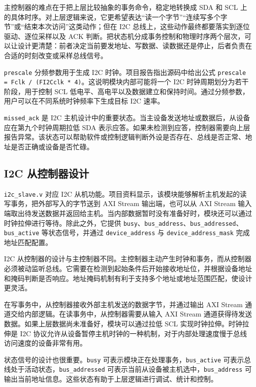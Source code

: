 \documentclass[12pt,a4paper]{article}
\numberwithin{equation}{section}
\begin{document}
主控制器的难点在于把上层比较抽象的事务命令，稳定地转换成 SDA 和 SCL 上的具体时序。对上层逻辑来说，它更希望表达“读一个字节”“连续写多个字节”或“结束本次访问”这类动作；但在 I2C 总线上，这些动作最终都要落实到逐位驱动、逐位采样以及 ACK 判断。把状态机分成事务控制和物理时序两个层次，可以让设计更清楚：前者决定当前要发地址、写数据、读数据还是停止，后者负责在合适的时刻改变或采样总线信号。

\texttt{prescale} 分频参数用于生成 I2C 时钟。项目报告指出源码中给出公式 \texttt{prescale = Fclk / (FI2Cclk * 4)}。这说明模块内部可能将一个 I2C 时钟周期划分为若干阶段，用于控制 SCL 低电平、高电平以及数据建立和保持时间。通过分频参数，用户可以在不同系统时钟频率下生成目标 I2C 速率。

\texttt{missed\_ack} 是 I2C 主机设计中的重要状态。当主设备发送地址或数据后，从设备应在第九个时钟周期拉低 SDA 表示应答。如果未检测到应答，控制器需要向上层报告异常。该状态可以帮助软件或控制逻辑判断外设是否存在、总线是否正常、地址是否正确或设备是否忙碌。

\subsection{I2C 从控制器设计}

\texttt{i2c\_slave.v} 对应 I2C 从机功能。项目资料显示，该模块能够解析主机发起的读写事务，把外部写入的字节送到 AXI Stream 输出端，也可以从 AXI Stream 输入端取出待发送数据并返回给主机。当内部数据暂时没有准备好时，模块还可以通过时钟拉伸进行等待。除此之外，它提供 \texttt{busy}、\texttt{bus\_address}、\texttt{bus\_addressed}、\texttt{bus\_active} 等状态信号，并通过 \texttt{device\_address} 与 \texttt{device\_address\_mask} 完成地址匹配配置。

I2C 从控制器的设计与主控制器不同。主控制器主动产生时钟和事务，而从控制器必须被动监听总线。它需要在检测到起始条件后开始接收地址位，并根据设备地址和掩码判断是否响应。地址掩码机制有利于支持多个地址或地址范围匹配，使设计更灵活。

在写事务中，从控制器接收外部主机发送的数据字节，并通过输出 AXI Stream 通道交给内部逻辑。在读事务中，从控制器需要从输入 AXI Stream 通道获得待发送数据。如果上层数据尚未准备好，模块可以通过拉低 SCL 实现时钟拉伸。时钟拉伸是 I2C 协议允许从设备暂停主机时钟的一种机制，对于内部处理速度慢于总线访问速度的设备非常有用。

状态信号的设计也很重要。\texttt{busy} 可表示模块正在处理事务，\texttt{bus\_active} 可表示总线处于活动状态，\texttt{bus\_addressed} 可表示当前从设备被主机选中，\texttt{bus\_address} 可输出当前地址信息。这些状态有助于上层逻辑进行调试、统计和控制。
\end{document}
